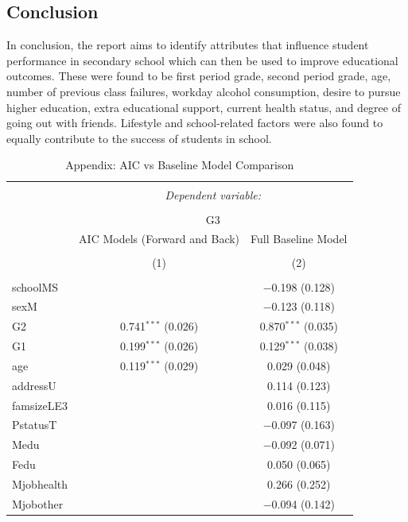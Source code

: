 \documentclass[a4paper,8pt,twocolumn,twoside,]{pinp}
\begin{document}
\hypertarget{conclusion}{%
\subsection{Conclusion}\label{conclusion}}

In conclusion, the report aims to identify attributes that influence
student performance in secondary school which can then be used to
improve educational outcomes. These were found to be first period grade,
second period grade, age, number of previous class failures, workday
alcohol consumption, desire to pursue higher education, extra
educational support, current health status, and degree of going out with
friends. Lifestyle and school-related factors were also found to equally
contribute to the success of students in school.

\begin{table}[!htbp] \centering 
  \caption{Appendix: AIC vs Baseline Model Comparison} 
  \label{} 
\small 
\begin{tabular}{@{\extracolsep{1pt}}lcc} 
\\[-1.8ex]\hline 
\hline \\[-1.8ex] 
 & \multicolumn{2}{c}{\textit{Dependent variable:}} \\ 
\cline{2-3} 
\\[-1.8ex] & \multicolumn{2}{c}{G3} \\ 
 & AIC Models (Forward and Back) & Full Baseline Model \\ 
\\[-1.8ex] & (1) & (2)\\ 
\hline \\[-1.8ex] 
 schoolMS &  & $-$0.198 (0.128) \\ 
  sexM &  & $-$0.123 (0.118) \\ 
  G2 & 0.741$^{***}$ (0.026) & 0.870$^{***}$ (0.035) \\ 
  G1 & 0.199$^{***}$ (0.026) & 0.129$^{***}$ (0.038) \\ 
  age & 0.119$^{***}$ (0.029) & 0.029 (0.048) \\ 
  addressU &  & 0.114 (0.123) \\ 
  famsizeLE3 &  & 0.016 (0.115) \\ 
  PstatusT &  & $-$0.097 (0.163) \\ 
  Medu &  & $-$0.092 (0.071) \\ 
  Fedu &  & 0.050 (0.065) \\ 
  Mjobhealth &  & 0.266 (0.252) \\ 
  Mjobother &  & $-$0.094 (0.142) \\ 

\end{tabular}
\end{table}
\end{document}
